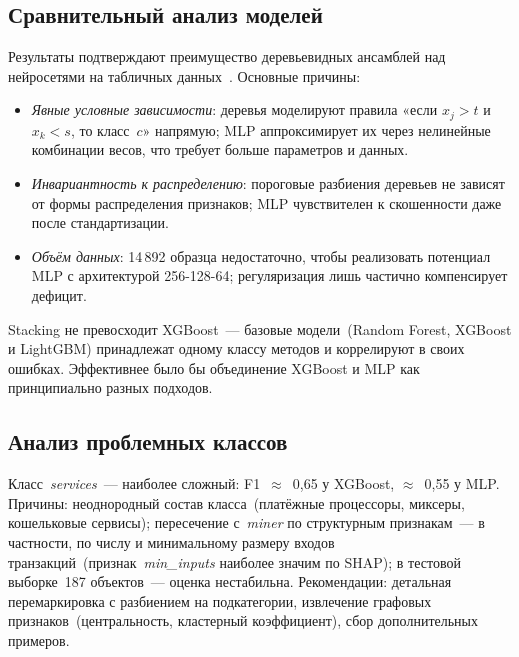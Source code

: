 \subsection{Сравнительный анализ моделей}

Результаты подтверждают преимущество деревьевидных ансамблей над нейросетями на табличных данных~\cite{tabular_dl_survey}. Основные причины:
\begin{itemize}
    \item \textit{Явные условные зависимости}: деревья моделируют правила «если $x_j > t$ и $x_k < s$, то класс~$c$» напрямую; MLP аппроксимирует их через нелинейные комбинации весов, что требует больше параметров и данных.
    \item \textit{Инвариантность к распределению}: пороговые разбиения деревьев не зависят от формы распределения признаков; MLP чувствителен к скошенности даже после стандартизации.
    \item \textit{Объём данных}: 14\,892 образца недостаточно, чтобы реализовать потенциал MLP с архитектурой 256-128-64; регуляризация лишь частично компенсирует дефицит.
\end{itemize}

Stacking не превосходит XGBoost~--- базовые модели~(Random Forest, XGBoost и LightGBM) принадлежат одному классу методов и коррелируют в своих ошибках. Эффективнее было бы объединение XGBoost и MLP как принципиально разных подходов.

\subsection{Анализ проблемных классов}

Класс~\textit{services}~--- наиболее сложный: F1~$\approx$~0,65 у XGBoost, $\approx$~0,55 у MLP. Причины: неоднородный состав класса~(платёжные процессоры, миксеры, кошельковые сервисы); пересечение с~\textit{miner} по структурным признакам~--- в частности, по числу и минимальному размеру входов транзакций~(признак~\textit{min\_inputs} наиболее значим по SHAP); в тестовой выборке~187 объектов~--- оценка нестабильна. Рекомендации: детальная перемаркировка с разбиением на подкатегории, извлечение графовых признаков~(центральность, кластерный коэффициент), сбор дополнительных примеров.

